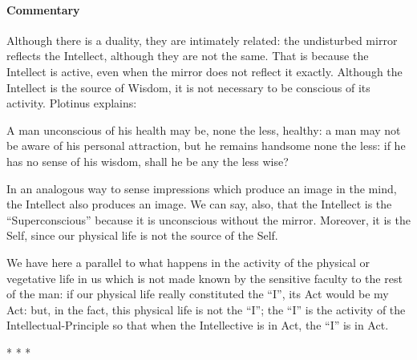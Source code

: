 \paragraph{Commentary}


Although there is a duality, they are intimately related: the undisturbed mirror reflects the Intellect, although they are not the same. That is because the Intellect is active, even when the mirror does not reflect it exactly. Although the Intellect is the source of Wisdom, it is not necessary to be conscious of its activity. Plotinus explains:

\begin{quotex}
A man unconscious of his health may be, none the less, healthy: a man may not be aware of his personal attraction, but he remains handsome none the less: if he has no sense of his wisdom, shall he be any the less wise?
\end{quotex}


In an analogous way to sense impressions which produce an image in the mind, the Intellect also produces an image. We can say, also, that the Intellect is the ``Superconscious'' because it is unconscious without the mirror. Moreover, it is the Self, since our physical life is not the source of the Self.

\begin{quotex}
We have here a parallel to what happens in the activity of the physical or vegetative life in us which is not made known by the sensitive faculty to the rest of the man: if our physical life really constituted the ``I'', its Act would be my Act: but, in the fact, this physical life is not the ``I''; the ``I'' is the activity of the Intellectual-Principle so that when the Intellective is in Act, the ``I'' is in Act.
\end{quotex}




\begin{center}* * *\end{center}

